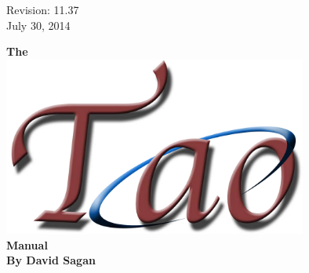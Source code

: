 \thispagestyle{empty}

\begin{flushright}
\large
  Revision: 11.37 \\
  July 30, 2014 \\
\end{flushright}

\vfill


{
\begin{center}
{\Huge \sf\bf The} \\
\vskip 0.1in
\includegraphics[width=10cm]{tao-logo.pdf} \\
\vskip 0.1in
{\Huge \sf\bf Manual} \\
\vskip 0.4in
{\Large \sf\bf By David Sagan} \\
\end{center}
}

\vfill
\break
